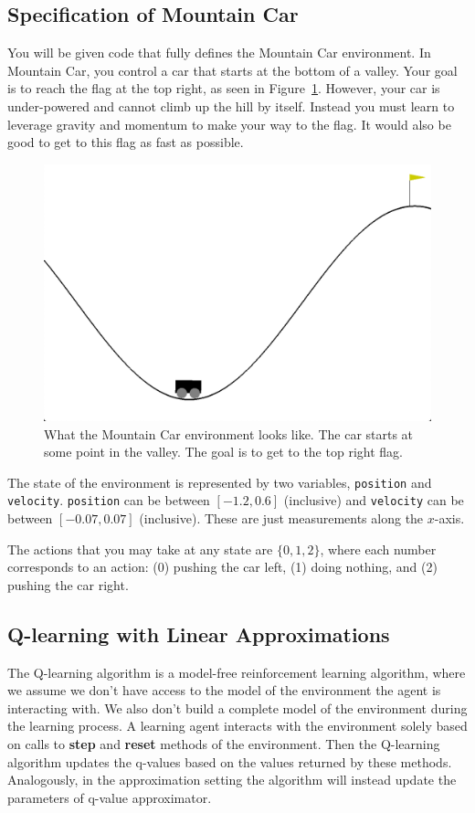\documentclass[11pt,addpoints,answers]{exam}
\begin{document}
\subsection{Specification of Mountain Car}
You will be given code that fully defines the Mountain Car environment. In Mountain Car, you control a car that starts at the bottom of a valley. Your goal is to reach the flag at the top right, as seen in Figure~\ref{fig:mountaincar}. However, your car is under-powered and cannot climb up the hill by itself. Instead you must learn to leverage gravity and momentum to make your way to the flag. It would also be good to get to this flag as fast as possible.

\begin{figure}[H]
    \centering
    \includegraphics[width=0.5\linewidth]{figs/MountainCar.png}
    \caption{What the Mountain Car environment looks like. The car starts at some point in the valley. The goal is to get to the top right flag.}
    \label{fig:mountaincar}
\end{figure}

The state of the environment is represented by two variables, \texttt{position} and \texttt{velocity}. \texttt{position} can be between $[-1.2, 0.6]$ (inclusive) and \texttt{velocity} can be between $[-0.07, 0.07]$ (inclusive). These are just measurements along the $x$-axis.

The actions that you may take at any state are $\{0, 1, 2\}$, where each number corresponds to an action: (0) pushing the car left, (1) doing nothing, and (2) pushing the car right.

\subsection{Q-learning with Linear Approximations}
The Q-learning algorithm is a model-free reinforcement learning algorithm, where we assume we don't have access to the model of the environment the agent is interacting with. We also don't build a complete model of the environment during the learning process. A learning agent interacts with the environment solely based on calls to \textbf{step} and \textbf{reset} methods of the environment. Then the Q-learning algorithm updates the q-values based on the values returned by these methods. Analogously, in the approximation setting the algorithm will instead update the parameters of q-value approximator.
\end{document}
